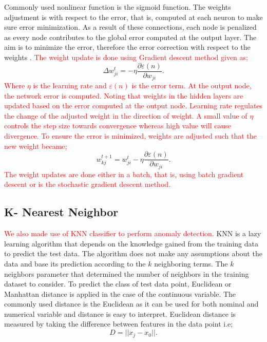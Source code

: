 \documentclass[a4paper,fleqn]{cas-dc}
\newcommand\mycorrections[1]{\textcolor{red}{#1}}
\begin{document}
Commonly used nonlinear function is the sigmoid function. The weights adjustment is with respect to the error, that is, computed at each neuron to make sure error minimization. As a result of these connections, each node is penalized as every node contributes to the global error computed at the output layer. The aim is to minimize the error, therefore the error correction with respect to the weights  \cite{haykin2004comprehensive}.  \mycorrections {The weight update is done using Gradient descent method given as;}
\begin{equation}\label{enq7}
\Delta w_{ji}^{t} =- \eta\frac{\partial \varepsilon(n)}{\partial w_{ji}}.
\end{equation}
\mycorrections {Where $\eta$ is the learning rate and $\varepsilon(n)$ is the error term. At the output node, the network error is computed. Noting that weights in the hidden layers are updated based on the error computed at the output node.
	Learning rate regulates the change of the adjusted weight in the direction of weight. A small value of $\eta$ controls the step size towards convergence whereas high value will cause divergence.
	To ensure the error is minimized, weights are adjusted such that the new weight became;}
\begin{equation}
w_{kj}^{t +1} =w_{ji}^{t}- \eta\frac{\partial \varepsilon(n)}{\partial w_{ji}}.
\end{equation}
\mycorrections {The weight updates are done either in a batch, that is, using batch gradient descent or is the stochastic gradient descent method.}
\subsection{K- Nearest Neighbor }
\mycorrections{We also made use of KNN classifier to perform anomaly detection. }
KNN is a lazy learning algorithm that depends on the knowledge gained from the training data to predict the test data. The algorithm does not make any assumptions about the data and base its prediction according to the   $k$ neighboring terms. The $k$ neighbors parameter that determined the number of neighbors in the training dataset to consider. To predict the class of test data point, Euclidean or Manhattan distance is applied in the case of the continuous variable. The commonly used distance is the Euclidean as it can be used for both nominal and numerical variable and distance is easy to interpret. Euclidean distance is measured by taking the difference between features in the data point i.e;
\begin{equation}
D = || x_{j} - x_{0} ||.
\end{equation}
\end{document}
